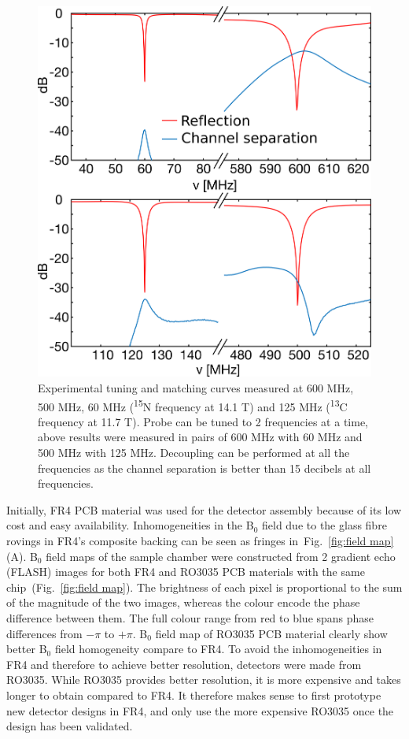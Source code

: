 \documentclass[preprint,5p]{elsarticle}
\newcommand{\fig}[1]{Fig.~\ref{#1}}
\begin{document}
\cbstart
\begin{figure} \centering
\includegraphics[width=\linewidth,keepaspectratio=true]{./figures/ms5n17-tlp-im-180710-tandm-sameaxis.png}
\caption{ Experimental tuning and matching curves measured at 600 MHz, 500 MHz,
60 MHz (\textsuperscript{15}N frequency at 14.1 T) and 125 MHz
(\textsuperscript{13}C frequency at 11.7 T). Probe can be tuned to 2
frequencies at a time, above results were measured in pairs of 600 MHz with 60
MHz and 500 MHz with 125 MHz. Decoupling can be performed at all the frequencies
as the channel separation is better than 15 decibels at all frequencies.}
\label{fig:tandm}
\end{figure}
\cbend
Initially, FR4 PCB material was used for the
detector assembly because of its low cost and easy availability. Inhomogeneities
in the B$_0$ field due to the glass fibre rovings in FR4's composite backing can
be seen as fringes in~\fig{fig:field map} (A). \cbdelete B$_{0}$ field maps of the sample
chamber were constructed from 2 gradient echo (FLASH) images for both FR4
and RO3035 PCB materials with the same chip~(\fig{fig:field map}). The
brightness of each pixel is proportional to the sum of the magnitude of the two
images, whereas the colour encode the phase difference between them. The full
colour range from red to blue spans phase differences from $-\pi$ to $+\pi$.
\cbdelete
B$_{0}$ field map of RO3035 PCB material clearly show better B$_{0}$ field homogeneity compare to FR4. To avoid the inhomogeneities in FR4 and therefore to achieve better resolution,
detectors were made from RO3035. While RO3035 provides better
resolution, it is more expensive and takes longer to obtain compared to FR4. It
therefore makes sense to first prototype new detector designs in FR4, and only
use the more expensive RO3035 once the design has been validated.
\end{document}
